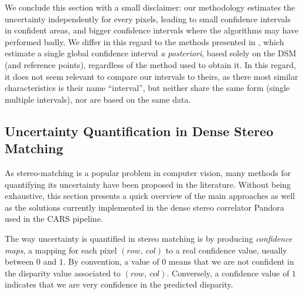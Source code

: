 We conclude this section with a small disclaimer: our methodology estimates the uncertainty independently for every pixels, leading to small confidence intervals in confident areas, and bigger confidence intervals where the algorithms may have performed badly. We differ in this regard to the methods presented in , which estimate a single global confidence interval \textit{a posteriori}, based solely on the DSM (and reference points), regardless of the method used to obtain it. In this regard, it does not seem relevant to compare our intervals to theirs, as there most similar characteristics is their name ``interval'', but neither share the same form (single \vs multiple intervals), nor are based on the same data. 

\subsection{Uncertainty Quantification in Dense Stereo Matching}\label{sec:uncertainty_pandora}
As stereo-matching is a popular problem in computer vision, many methods for quantifying its uncertainty have been proposed in the literature. Without being exhaustive, this section presents a quick overview of the main approaches as well as the solutions currently implemented in the dense stereo correlator Pandora used in the CARS pipeline.

The way uncertainty is quantified in stereo matching is by producing \textit{confidence maps}, \ie a mapping for each pixel $(row, ~col)$ to a real confidence value, usually between $0$ and $1$. By convention, a value of $0$ means that we are not confident in the disparity value associated to $(row, ~col)$. Conversely, a confidence value of $1$ indicates that we are very confidence in the predicted disparity.

